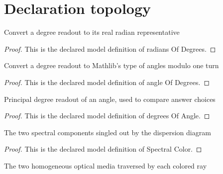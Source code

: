 \section{Declaration topology}
\begin{definition}
  \label{def:physics:phyx-mini-0073:phyxminiproblems-problemphyxmini0073-radiansofdegrees}
  Convert a degree readout to its real radian representative
\end{definition}
\begin{proof}
  This is the declared model definition of radians Of Degrees.
\end{proof}
\begin{definition}
  \label{def:physics:phyx-mini-0073:phyxminiproblems-problemphyxmini0073-angleofdegrees}
  Convert a degree readout to Mathlib's type of angles modulo one turn
\end{definition}
\begin{proof}
  This is the declared model definition of angle Of Degrees.
\end{proof}
\begin{definition}
  \label{def:physics:phyx-mini-0073:phyxminiproblems-problemphyxmini0073-degreesofangle}
  Principal degree readout of an angle, used to compare answer choices
\end{definition}
\begin{proof}
  This is the declared model definition of degrees Of Angle.
\end{proof}
\begin{definition}
  \label{def:physics:phyx-mini-0073:phyxminiproblems-problemphyxmini0073-spectralcolor}
  The two spectral components singled out by the dispersion diagram
\end{definition}
\begin{proof}
  This is the declared model definition of Spectral Color.
\end{proof}
\begin{definition}
  \label{def:physics:phyx-mini-0073:phyxminiproblems-problemphyxmini0073-opticalmedium}
  The two homogeneous optical media traversed by each colored ray
\end{definition}
